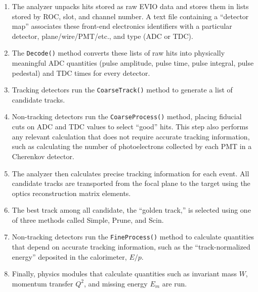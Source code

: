 \begin{enumerate}

    \item The analyzer unpacks hits stored as raw EVIO data and stores them in
        lists stored by ROC, slot, and channel number.
        A text file containing a ``detector map'' associates these front-end
        electronics identifiers with a particular detector,
        plane/wire/PMT/etc., and type (ADC or TDC).

    \item The \texttt{Decode()} method converts these lists of raw hits into
        physically meaningful ADC quantities (pulse amplitude, pulse time,
        pulse integral, pulse pedestal) and TDC times for every detector.

    \item Tracking detectors run the \texttt{CoarseTrack()} method to generate
        a list of candidate tracks.

    \item Non-tracking detectors run the \texttt{CoarseProcess()} method,
        placing fiducial cuts on ADC and TDC values to select ``good'' hits.
        This step also performs any relevant calculation that does not require
        accurate tracking information, such as calculating the number of
        photoelectrons collected by each PMT in a Cherenkov detector.

    \item The analyzer then calculates precise tracking information for each
        event.
        All candidate tracks are transported from the focal plane to the target
        using the optics reconstruction matrix elements.

    \item The best track among all candidate, the ``golden track,'' is selected
        using one of three methods called Simple, Prune, and Scin.

    \item Non-tracking detectors run the \texttt{FineProcess()} method to
        calculate quantities that depend on accurate tracking information,
        such as the ``track-normalized energy'' deposited in the calorimeter,
        $E/p$.

    \item Finally, physics modules that calculate quantities such as invariant
        mass $W$, momentum transfer $Q^2$, and missing energy $E_m$ are run.

\end{enumerate}


